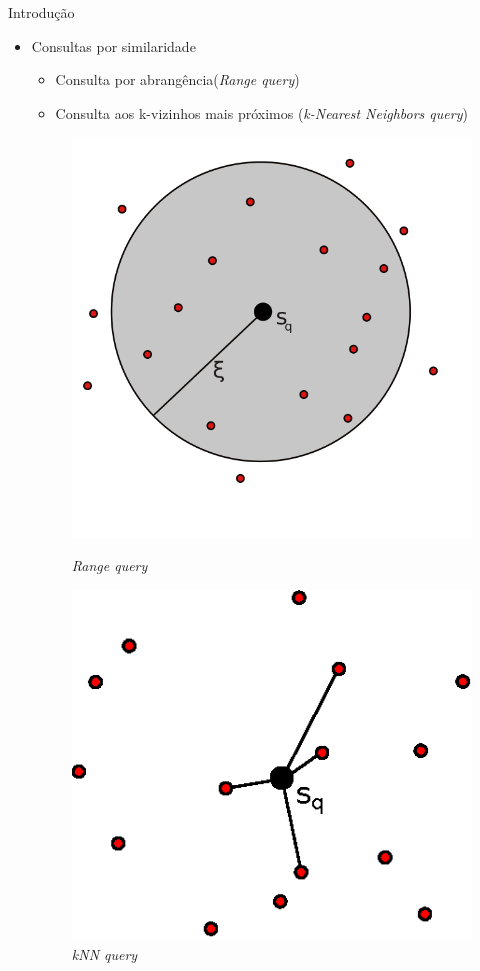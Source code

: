 \documentclass{beamer}
\begin{document}
\begin{frame}{Introdução}
  \begin{itemize}
   \item Consultas por similaridade\newline
      \begin{itemize}
	  \item Consulta por abrangência(\textit{Range query})\newline
	  \item Consulta aos k-vizinhos mais próximos (\textit{k-Nearest Neighbors query})
      \end{itemize}
	
	\begin{figure}
\centering
\begin{minipage}{.4\textwidth}
  \centering
  \includegraphics[width=.9\linewidth]{rq.png}
  \caption{\textit{Range query}}
  \label{fig:rq}
\end{minipage}%
\begin{minipage}{.6\textwidth}
  \centering
  \includegraphics[width=.6\linewidth]{knnq.eps}
  \caption{\textit{kNN query}}
  \label{fig:knnq}
\end{minipage}
\end{figure}
	
  \end{itemize}


\end{frame}
\end{document}
